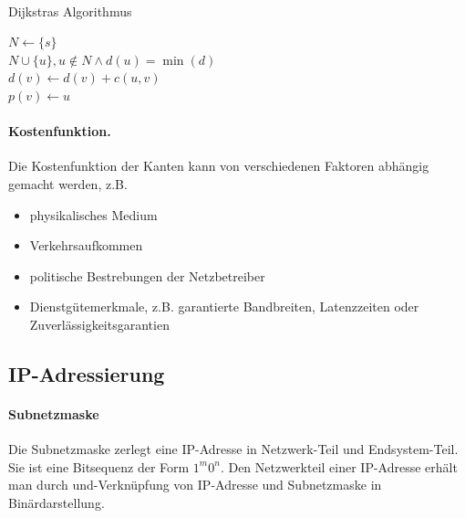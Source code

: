 \documentclass[]{scrartcl}
\begin{document}
\paragraph{}

\begin{algorithm}[H]
\caption{Dijkstras Algorithmus}
$N \gets \{ s \}$ \\
 {
 {
	$N \cup \{ u \} ,  u \not \in N \wedge d(u) = \min (d)$\\
	 {
		 {
			$d(v) \gets d(v) + c(u,v)$ \\
			$p(v) \gets u$ \\
		}
	}
}
}

\end{algorithm}


\paragraph{Kostenfunktion.} Die Kostenfunktion der Kanten kann von verschiedenen Faktoren abh\"angig gemacht werden, z.B.
\begin{itemize}
\item physikalisches Medium
\item Verkehrsaufkommen
\item politische Bestrebungen der Netzbetreiber
\item Dienstg\"utemerkmale, z.B. garantierte Bandbreiten, Latenzzeiten oder Zuverl\"assigkeitsgarantien
\end{itemize}




\subsection{IP-Adressierung}

\paragraph{Subnetzmaske} Die Subnetzmaske zerlegt eine IP-Adresse in Netzwerk-Teil und Endsystem-Teil. Sie ist eine Bitsequenz der Form $1^m0^n$. Den Netzwerkteil einer IP-Adresse erh\"alt man durch und-Verkn\"upfung von IP-Adresse und Subnetzmaske in Bin\"ardarstellung.
\end{document}

